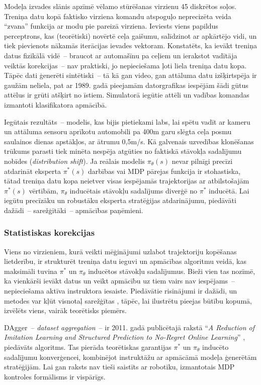 \documentclass[12pt, a4paper]{article}
\numberwithin{equation}{section} %
\begin{document}
Modeļa izvades slānis apzīmē vēlamo stūrēšanas virzienu 45 diskrētos soļos. Treniņa datu kopā faktisko virziena komandu atspoguļo neprecizēta veida ``zvana'' funkcija ar modu pie pareizā virziena. Ieviests viens papildus perceptrons, kas (teorētiski) novērtē ceļa gaišumu, salīdzinot ar apkārtējo vidi, un tiek pievienots nākamās iterācijas ievades vektoram. Konstatēts, ka ievākt treniņa datus fizikālā vidē~-- braucot ar automašīnu pa ceļiem un ierakstot vadītāja veiktās korekcijas~-- nav praktiski, jo nepieciešama ļoti liela treniņa datu kopa. Tāpēc dati ģenerēti sintētiski~-- tā kā gan video, gan attāluma datu izšķirtspēja ir gaužām neliela, pat ar 1989. gadā pieejamām datorgrafikas iespējām šādi gūtus attēlus ir grūti atšķirt no īstiem. Simulatorā iegūtie attēli un vadības komandas izmantoti klasifikatora apmācībā.

Iegūtais rezultāts~-- modelis, kas bijis pietiekami labs, lai spētu vadīt ar kameru un attāluma sensoru aprīkotu automobili pa 400m garu slēgta ceļa posmu saulainos dienas apstākļos, ar ātrumu 0,5m/s. Kā galvenais uzvedības klonēšanas trūkums parasti tiek minēta nespēja atgūties no faktiskā stāvokļa sadalījumu nobīdes \cite{attia2018global} (\textit{distribution shift}). Ja reālais modelis $\pi_{\theta}(s)$ nevar pilnīgi precīzi atdarināt eksperta $\pi^*(s)$ darbības vai MDP pārejas funkcija ir stohastiska, tātad treniņa datu kopa neietver visas iespējamās trajektorijas ar atbilstošajām $\pi^*(s)$ vērtībām, $\pi_{\theta}$ inducētais stāvokļu sadalījums diverģē no $\pi^*$ inducētā. Lai iegūtu precīzāku un robustāku eksperta stratēģijas atdarinājumu, piedāvāti dažādi~-- sarežģītāki~-- apmācības paņēmieni.

\subsubsection{Statistiskas korekcijas}

Viens no virzieniem, kurā veikti mēģinājumi uzlabot trajektoriju kopēšanas lietderību, ir strukturēt treniņa datu ieguvi un apmācības algoritmu veidā, kas maksimāli tuvina $\pi^*$ un $\pi_{\theta}$ inducētos stāvokļu sadalījumus. Bieži vien tas nozīmē, ka vienkārši ievākt datus un veikt apmācību uz tiem vairs nav iespējams~-- nepieciešama aktīva instruktora iesaiste. Piedāvātie risinājumi ir dažādi, un metodes var kļūt visnotaļ sarežģītas \cite{attia2018global}, tāpēc, lai ilustrētu pieejas būtību kopumā, izvēlēts viens, vairāk teorētisks piemērs.

DAgger~-- \textit{dataset aggregation}~-- ir 2011. gadā publicētajā rakstā ``\textit{A Reduction of Imitation Learning and Structured Prediction
to No-Regret Online Learning}'' \cite{ross2011no}, piedāvāts algoritms. Tas pierāda teorētiskas garantijas $\pi^*$ un $\pi_{\theta}$ inducēto sadalījumu konverģencei, kombinējot instruktāžu ar apmācāmā modeļa ģenerētām stratēģijām. Lai gan raksts nav tieši saistīts ar robotiku, izmantotais MDP kontroles formālisms ir vispārīgs.
\end{document}
